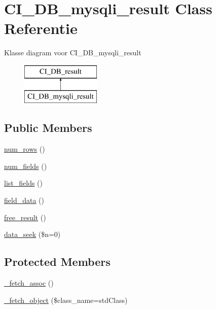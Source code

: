 \hypertarget{class_c_i___d_b__mysqli__result}{}\section{C\+I\+\_\+\+D\+B\+\_\+mysqli\+\_\+result Class Referentie}
\label{class_c_i___d_b__mysqli__result}
Klasse diagram voor C\+I\+\_\+\+D\+B\+\_\+mysqli\+\_\+result\begin{figure}[H]
\begin{center}
\leavevmode
\includegraphics[height=2.000000cm]{class_c_i___d_b__mysqli__result}
\end{center}
\end{figure}
\subsection*{Public Members}
\begin{DoxyCompactItemize}
\item 
\mbox{\hyperlink{class_c_i___d_b__mysqli__result_a218657c303ee499b97710ab0cd2f5d6e}{num\+\_\+rows}} ()
\item 
\mbox{\hyperlink{class_c_i___d_b__mysqli__result_af831bf363e4d7d661a717a4932af449d}{num\+\_\+fields}} ()
\item 
\mbox{\hyperlink{class_c_i___d_b__mysqli__result_a50b54eb4ea7cfd039740f532988ea776}{list\+\_\+fields}} ()
\item 
\mbox{\hyperlink{class_c_i___d_b__mysqli__result_a84bffd65e53902ade1591716749a33e3}{field\+\_\+data}} ()
\item 
\mbox{\hyperlink{class_c_i___d_b__mysqli__result_aad2d98d6beb3d6095405356c6107b473}{free\+\_\+result}} ()
\item 
\mbox{\hyperlink{class_c_i___d_b__mysqli__result_a8255ae91816e4206e29eb7581c5af0f1}{data\+\_\+seek}} (\$n=0)
\end{DoxyCompactItemize}
\subsection*{Protected Members}
\begin{DoxyCompactItemize}
\item 
\mbox{\hyperlink{class_c_i___d_b__mysqli__result_a43a9a92817f1334a1c10752ec44275a0}{\+\_\+fetch\+\_\+assoc}} ()
\item 
\mbox{\hyperlink{class_c_i___d_b__mysqli__result_a60806be6a9c2488820813c2a7f4fef71}{\+\_\+fetch\+\_\+object}} (\$class\+\_\+name=\textquotesingle{}std\+Class\textquotesingle{})
\end{DoxyCompactItemize}
